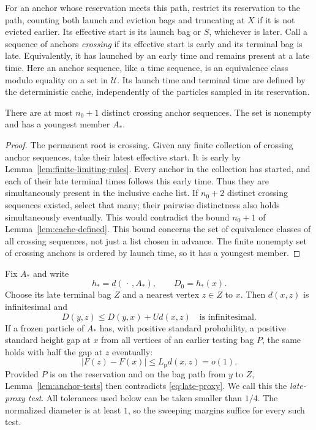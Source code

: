 For an anchor whose reservation meets this path, restrict its reservation
to the path, counting both launch and eviction bags and truncating at $X$
if it is not evicted earlier.  Its
effective start is its launch bag or $S$, whichever is later.  Call a
sequence of anchors \emph{crossing} if its effective start is early and
its terminal bag is late.  Equivalently, it has launched by an early
time and remains present at a late time.
Here an anchor sequence, like a time sequence, is an equivalence class
modulo equality on a set in $\mathcal U$.  Its launch time and terminal
time are defined by the deterministic cache, independently of the
particles sampled in its reservation.

\begin{lemma}\label{lem:youngest-crossing}
There are at most $n_0+1$ distinct crossing anchor sequences.  The set is
nonempty and has a youngest member $A_*$.
\end{lemma}

\begin{proof}
The permanent root is crossing.  Given any finite collection of crossing
anchor sequences, take their latest effective start.  It is early by
Lemma~\ref{lem:finite-limiting-rules}.  Every anchor in the collection
has started, and each of their late terminal times follows this early
time.  Thus they are simultaneously present in the inclusive cache list.
If $n_0+2$ distinct crossing sequences existed, select that many; their
pairwise distinctness also holds simultaneously eventually.  This would
contradict the bound $n_0+1$ of Lemma~\ref{lem:cache-defined}.
This bound concerns the set of equivalence classes of all crossing
sequences, not just a list chosen in advance.
The finite nonempty set of crossing anchors is ordered by launch time,
so it has a youngest member.
\end{proof}

Fix $A_*$ and write
\[
 h_*=d(\,\cdot\,,A_*),\qquad D_0=h_*(x).
\]
Choose its late terminal bag $Z$ and a nearest vertex $z\in Z$ to $x$.
Then $d(x,z)$ is infinitesimal and
\begin{equation}\label{eq:late-proxy}
 D(y,z)\leq D(y,x)+U d(x,z)
 \quad\text{is infinitesimal}.
\end{equation}
If a frozen particle of $A_*$ has, with positive standard probability,
a positive standard height gap at $x$ from all vertices of an earlier
testing bag $P$, the same holds with half the gap at $z$ eventually:
\[
 |F(z)-F(x)|\leq L_{\mathrm{p}}d(x,z)=o(1).
\]
Provided $P$ is on the reservation and on the bag path from $y$ to $Z$,
Lemma~\ref{lem:anchor-tests} then contradicts
\eqref{eq:late-proxy}.  We call this the \emph{late-proxy test}.
All tolerances used below can be taken smaller than $1/4$.  The normalized
diameter is at least $1$, so the sweeping margins suffice for every such
test.


